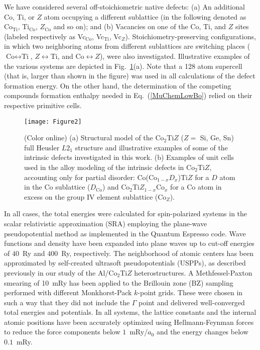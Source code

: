 \documentclass[aps,prb,twocolumn,superscriptaddress,showpacs]{revtex4}
\newcommand{\FG}[1]{Fig.~\ref{#1}}
\newcommand{\EQ}[1]{Eq.~(\ref{#1})}
\begin{document}
We have considered several off-stoichiometric native
defects: (a) An additional Co, Ti, or $Z$ atom occupying a different
sublattice (in the following denoted as Co$_\text{Ti}$,
Ti$_\text{Co}$, $Z_\text{Co}$ and so on); and (b) Vacancies
on one of the Co, Ti, and $Z$ sites (labeled respectively
as Vc$_\text{Co}$, Vc$_\text{Ti}$, Vc$_Z$). Stoichiometry-preserving
configurations, in which two neighboring atoms from different sublattices
are switching places 
($\text{Co}\leftrightarrow\text{Ti}$, 
$Z\leftrightarrow\text{Ti}$, and $\text{Co}\leftrightarrow{Z}$), 
were also investigated. 
Illustrative examples of the various systems
are depicted in \FG{FigStruc}(a). Note that
a 128 atom supercell (that is, larger than shown in the figure) 
was used in all calculations of the defect formation energy. 
On the other hand, the determination of the competing 
compounds formation enthalpy needed in \EQ{MuChemLowBo}
relied on their respective primitive cells.


\begin{figure}
 \texttt{[image: Figure2]}
     \caption{(Color online) (a) Structural model of the
   Co$_2$Ti$Z$ ($Z=$ Si, Ge, Sn) full Heusler 
   $L2_1$ structure and illustrative examples of some of 
   the intrinsic defects investigated in this work. 
   (b) Examples of unit cells used in the alloy modeling 
   of the intrinsic defects in Co$_2$Ti$Z$, accounting only
   for partial disorder: 
   Co(Co$_{1-x}D_x$)Ti$Z$ for a $D$ atom in the Co sublattice 
   ($D_\text{Co}$) and Co$_2$Ti$Z_{1-x}$Co$_x$ 
   for a Co atom in excess on the
   group IV element sublattice (Co$_Z$).}
     \label{FigStruc}
\end{figure}


In all cases, the total energies were calculated for 
spin-polarized systems in the scalar relativistic 
approximation (SRA)
employing the plane-wave pseudopotential method
as implemented in the Quantum Espresso code.\cite{PWSCF}
Wave functions and density have been expanded into plane waves
up to cut-off energies of $40$~Ry and $400$~Ry, respectively.
The neighborhood of atomic centers has been approximated by
self-created ultrasoft pseudopotentials (USPPs),\cite{Vanderbilt:1990}
as described previously in our study of the
Al/Co$_2$Ti$Z$ heterostructures.\cite{GKP14}
A Methfessel-Paxton smearing\cite{MePa89} of 10~mRy
has been applied to the Brillouin zone (BZ) sampling
performed with different Monkhorst-Pack $k$-point grids.\cite{MoPa76}
These were chosen in such a way that they did not include the 
$\Gamma$ point and delivered well-converged total energies and
potentials. In all systems, the lattice constants and 
the internal atomic positions have been 
accurately optimized using Hellmann-Feynman forces to reduce the 
force components below $1$~mRy/$a_0$ 
and the energy changes below $0.1$~mRy.
\end{document}
